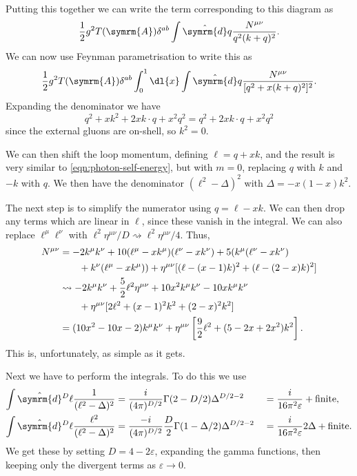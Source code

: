 \documentclass[fleqn]{NotesClass}
\newcommand{\dhat}[1]{\hat{\symrm{d}}{#1}}
\newcommand{\minkowskiMetric}{\eta}
\newcommand{\adjointRep}{\symrm{A}}
\begin{document}
    Putting this together we can write the term corresponding to this diagram as
    \begin{equation}
        \frac{1}{2}g^2 T(\adjointRep)\delta^{ab} \int \dhat{q} \frac{N^{\mu\nu}}{q^2(k + q)^2}.
    \end{equation}
    We can now use Feynman parametrisation to write this as
    \begin{equation}
        \frac{1}{2}g^2 T(\adjointRep)\delta^{ab} \int_0^1 \dl{x} \int \dhat{q} \frac{N^{\mu\nu}}{[q^2 + x(k + q)^2]^2}.
    \end{equation}
    Expanding the denominator we have
    \begin{equation}
        q^2 + xk^2 + 2xk \cdot q + x^2q^2 = q^2 + 2xk \cdot q + x^2q^2
    \end{equation}
    since the external gluons are on-shell, so \(k^2 = 0\).
    
    We can then shift the loop momentum, defining \(\ell = q + xk\), and the result is very similar to \cref{eqn:photon-self-energy}, but with \(m = 0\), replacing \(q\) with \(k\) and \(-k\) with \(q\).
    We then have the denominator \((\ell^2 - \Delta)^2\) with \(\Delta = -x(1 - x)k^2\).
    
    The next step is to simplify the numerator using \(q = \ell - xk\).
    We can then drop any terms which are linear in \(\ell\), since these vanish in the integral.
    We can also replace \(\ell^\mu \ell^\nu\) with \(\ell^2\minkowskiMetric^{\mu\nu}/D\rightsquigarrow \ell^2\minkowskiMetric^{\mu\nu}/4\).
    Thus,
    \begin{align}
        N^{\mu\nu} &= - 2k^\mu k^\nu + 10(\ell^\mu - xk^\mu)(\ell^\nu - xk^\nu) + 5(k^\mu(\ell^\nu - xk^\nu) \notag\\
        &\qquad + k^\nu(\ell^\mu - xk^\mu)) + \minkowskiMetric^{\mu\nu}[(\ell - (x - 1)k)^2 + (\ell - (2 - x)k)^2]\\
        &\rightsquigarrow -2k^\mu k^\nu + \frac{5}{2}\ell^2\minkowskiMetric^{\mu\nu} + 10x^2 k^\mu k^\nu - 10xk^\mu k^\nu \notag\\
        &\qquad +\minkowskiMetric^{\mu\nu}[2\ell^2 + (x - 1)^2k^2 + (2 - x)^2k^2]\\
        &= (10x^2 - 10x - 2)k^\mu k^\nu + \minkowskiMetric^{\mu\nu} \left[ \frac{9}{2}\ell^2 + (5 - 2x + 2x^2)k^2 \right].
    \end{align}
    This is, unfortunately, as simple as it gets.
    
    Next we have to perform the integrals.
    To do this we use
    \begin{alignat*}{2}
        \int \dhat{^D\ell} \frac{1}{(\ell^2 - \Delta)^2} &= \frac{i}{(4\pi)^{D/2}} \Gamma(2 - D/2) \Delta^{D/2 - 2} &&= \frac{i}{16\pi^2\varepsilon} + \text{finite},\\
        \int \dhat{^D\ell} \frac{\ell^2}{(\ell^2 - \Delta)^2} &= \frac{-i}{(4\pi)^{D/2}} \frac{D}{2} \Gamma(1 - \Delta/2)\Delta^{D/2 - 2} &&= \frac{i}{16\pi^2\varepsilon} 2\Delta + \text{finite}.
    \end{alignat*}
    We get these by setting \(D = 4 - 2\varepsilon\), expanding the gamma functions, then keeping only the divergent terms as \(\varepsilon \to 0\).
    
\end{document}
